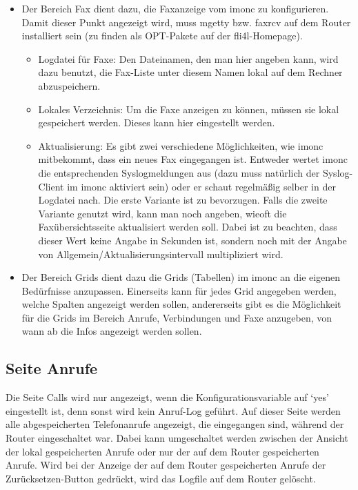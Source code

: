 \begin{itemize}
  \item Der Bereich Fax dient dazu, die Faxanzeige vom imonc zu konfigurieren. 
    Damit dieser Punkt angezeigt wird, muss mgetty bzw. faxrcv auf dem Router 
    installiert sein (zu finden als OPT-Pakete auf der fli4l-Homepage).
    \begin{itemize}
      \item Logdatei für Faxe: Den Dateinamen, den man hier angeben kann, wird 
        dazu benutzt, die Fax-Liste unter diesem Namen lokal auf dem Rechner 
        abzuspeichern.
      \item Lokales Verzeichnis: Um die Faxe anzeigen zu können, müssen sie
        lokal gespeichert werden. Dieses kann hier eingestellt werden.
      \item Aktualisierung: Es gibt zwei verschiedene Möglichkeiten, wie imonc
        mitbekommt, dass ein neues Fax eingegangen ist. Entweder wertet imonc
        die entsprechenden Syslogmeldungen aus (dazu muss natürlich der 
        Syslog-Client im imonc aktiviert sein) oder er schaut regelmäßig selber
        in der Logdatei nach. Die erste Variante ist zu bevorzugen. Falls die
        zweite Variante genutzt wird, kann man noch angeben, wieoft die
        Faxübersichtsseite aktualisiert werden soll. Dabei ist zu beachten, dass 
        dieser Wert keine Angabe in Sekunden ist, sondern noch mit der Angabe 
        von Allgemein/Aktualisierungsintervall multipliziert wird. 
    \end{itemize}

  \item Der Bereich Grids dient dazu die Grids (Tabellen) im imonc an die 
    eigenen Bedürfnisse anzupassen. Einerseits kann für jedes Grid angegeben 
    werden, welche Spalten angezeigt werden sollen, andererseits gibt es die 
    Möglichkeit für die Grids im Bereich Anrufe, Verbindungen und Faxe 
    anzugeben, von wann ab die Infos angezeigt werden sollen.
  \end{itemize}

  \subsection{Seite Anrufe}

  Die Seite Calls wird nur angezeigt, wenn die Konfigurationsvariable
   auf `yes' eingestellt ist, denn sonst wird kein
  Anruf-Log geführt. Auf dieser Seite werden alle abgespeicherten
  Telefonanrufe angezeigt, die eingegangen sind, während der Router
  eingeschaltet war. Dabei kann umgeschaltet werden zwischen der
  Ansicht der lokal gespeicherten Anrufe oder nur der auf dem Router
  gespeicherten Anrufe. Wird bei der Anzeige der auf dem Router
  gespeicherten Anrufe der Zurücksetzen-Button gedrückt, wird das Logfile auf
  dem Router gelöscht.

